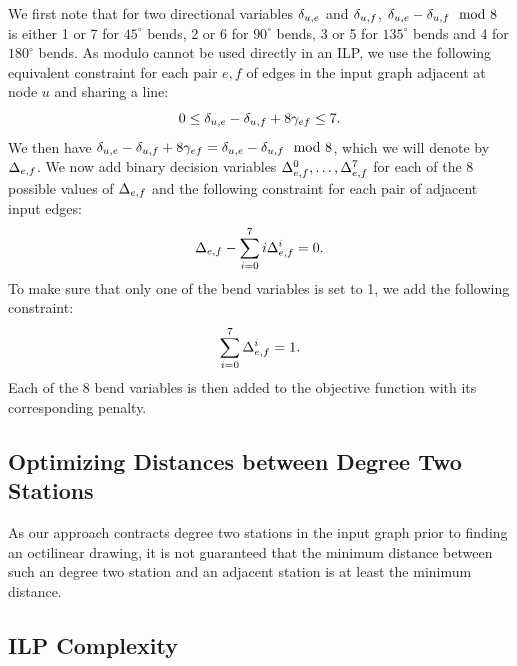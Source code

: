 \documentclass[sigconf]{acmart}
\begin{document}
We first note that for two directional variables $\delta_{u,e}$ and $\delta_{u,f}$, $\delta_{u,e} - \delta_{u,f} \mod 8$ is either 1 or 7 for $45^\circ$ bends, 2 or 6 for $90^\circ$ bends, 3 or 5 for $135^\circ$ bends and 4 for $180^\circ$ bends.
As modulo cannot be used directly in an ILP, we use the following equivalent constraint for each pair $e, f$ of edges in the input graph adjacent at node $u$ and sharing a line:
%
\begin{equation} 
  0 \leq \delta_{u,e} - \delta_{u,f} + 8 \gamma_{ef} \leq 7 \label{EQ:dirneg}.
\end{equation}
%
We then have $\delta_{u,e} - \delta_{u,f} + 8 \gamma_{ef} = \delta_{u,e} - \delta_{u,f} \mod 8$, which we will denote by $\Delta_{e,f}$.
We now add binary decision variables $\Delta_{e,f}^{0}, \dots, \Delta_{e,f}^{7}$ for each of the 8 possible values of $\Delta_{e,f}$ and the following constraint for each pair of adjacent input edges:
%
\begin{equation} 
  \Delta_{e,f} - \sum_{i = 0}^7 i\Delta_{e,f}^{i} = 0 \label{EQ:bendassign}.
\end{equation}
%
To make sure that only one of the bend variables is set to 1, we add the following constraint:
%
\begin{equation} 
  \sum_{i = 0}^7 \Delta_{e,f}^{i} = 1 \label{EQ:bendsum}.
\end{equation}
%
Each of the 8 bend variables is then added to the objective function with its corresponding penalty.

\subsection{Optimizing Distances between Degree Two Stations}
\label{SEC:ilpmindist}

As our approach contracts degree two stations in the input graph prior to finding an octilinear drawing, it is not guaranteed that the minimum distance between such an degree two station and an adjacent station is at least the minimum distance.


\subsection{ILP Complexity}
\end{document}

